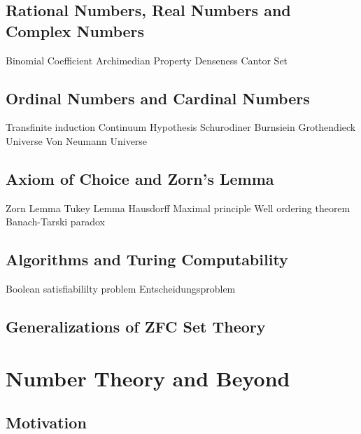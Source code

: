 \documentclass[11pt]{book}
\begin{document}
\section{Rational Numbers, Real Numbers and Complex Numbers}
Binomial Coefficient
Archimedian Property
Denseness
Cantor Set
\section{Ordinal Numbers and Cardinal Numbers}
\label{sec:cardinal}
Transfinite induction
Continuum Hypothesis
Schurodiner Burnsiein
Grothendieck Universe
Von Neumann Universe

\section{Axiom of Choice and Zorn's Lemma}
\label{sec:axoimofchoice}
Zorn Lemma
Tukey Lemma
Hausdorff Maximal principle
Well ordering theorem
Banach-Tarski paradox

\section{Algorithms and Turing Computability}
Boolean satisfiabililty problem
Entscheidungsproblem
\section{Generalizations of ZFC Set Theory}





\chapter{Number Theory and Beyond}
\section{Motivation}
\newpage
\end{document}
